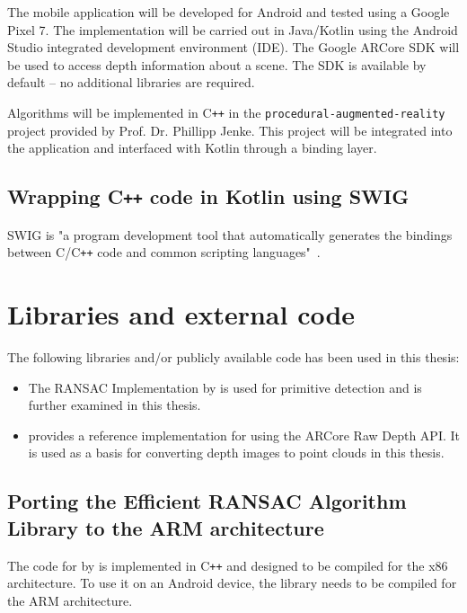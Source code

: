 The mobile application will be developed for Android and tested using a Google Pixel 7.
The implementation will be carried out in Java/Kotlin using the Android Studio integrated development environment (IDE).
The Google ARCore SDK will be used to access depth information about a scene.
The SDK is available by default -- no additional libraries are required.

Algorithms will be implemented in C\texttt{++} in the \texttt{procedural-augmented-reality} project provided by Prof. Dr. Phillipp Jenke.
This project will be integrated into the application and interfaced with Kotlin through a binding layer.

\subsection{Wrapping C\texttt{++} code in Kotlin using SWIG}
SWIG is "a program development tool that automatically generates the bindings between C/C\texttt{++}
code and common scripting languages"~\parencite{beazley_swig_1996}.


\section{Libraries and external code}
The following libraries and/or publicly available code has been used in this thesis:
\begin{itemize}
    \item The RANSAC Implementation by \citeauthor{schnabel_efficient_2007} is used for primitive detection
    and is further examined in this thesis. \parencite{schnabel_efficient_2007}
    \item {} provides a reference implementation for using the ARCore Raw Depth API.
    It is used as a basis for converting depth images to point clouds in this thesis.~\parencite{google_llc_codelab_raw_depth}
\end{itemize}

\subsection{Porting the Efficient RANSAC Algorithm Library to the ARM architecture}
The code for  by \citeauthor{schnabel_efficient_2007} is implemented in C\texttt{++}
and designed to be compiled for the x86 architecture.
To use it on an Android device, the library needs to be compiled for the ARM architecture.

